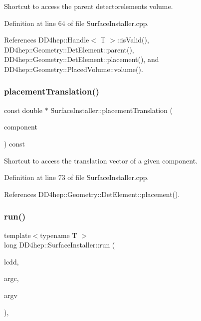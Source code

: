Shortcut to access the parent detectorelement\textquotesingle{}s volume. 



Definition at line 64 of file Surface\+Installer.\+cpp.



References D\+D4hep\+::\+Handle$<$ T $>$\+::is\+Valid(), D\+D4hep\+::\+Geometry\+::\+Det\+Element\+::parent(), D\+D4hep\+::\+Geometry\+::\+Det\+Element\+::placement(), and D\+D4hep\+::\+Geometry\+::\+Placed\+Volume\+::volume().

\hypertarget{class_d_d4hep_1_1_surface_installer_ae117d0932426df71bd90f865d0974a9e}{}\label{class_d_d4hep_1_1_surface_installer_ae117d0932426df71bd90f865d0974a9e} 
\subsubsection{\texorpdfstring{placement\+Translation()}{placementTranslation()}}
{\footnotesize\ttfamily const double $\ast$ Surface\+Installer\+::placement\+Translation (\begin{DoxyParamCaption}\item[{\hyperlink{class_d_d4hep_1_1_surface_installer_ab88f41bd9efd54b4b67baee892bfa926}{Det\+Element}}]{component }\end{DoxyParamCaption}) const}



Shortcut to access the translation vector of a given component. 



Definition at line 73 of file Surface\+Installer.\+cpp.



References D\+D4hep\+::\+Geometry\+::\+Det\+Element\+::placement().

\hypertarget{class_d_d4hep_1_1_surface_installer_ab005b78c2bd79a82f4d495e6d2f78939}{}\label{class_d_d4hep_1_1_surface_installer_ab005b78c2bd79a82f4d495e6d2f78939} 
\subsubsection{\texorpdfstring{run()}{run()}}
{\footnotesize\ttfamily template$<$typename T $>$ \\
long D\+D4hep\+::\+Surface\+Installer\+::run (\begin{DoxyParamCaption}\item[{\hyperlink{class_d_d4hep_1_1_geometry_1_1_l_c_d_d}{Geometry\+::\+L\+C\+DD} \&}]{lcdd,  }\item[{int}]{argc,  }\item[{char $\ast$$\ast$}]{argv }\end{DoxyParamCaption})\hspace{0.3cm}{\ttfamily [inline]}, {\ttfamily [static]}}



